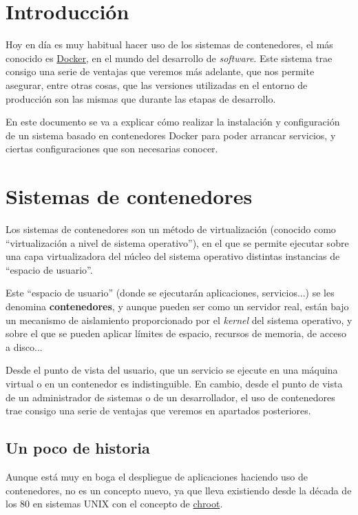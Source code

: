 \chapter{Introducción}

Hoy en día es muy habitual hacer uso de los sistemas de contenedores, el más conocido es \href{https://docs.docker.com/}{Docker}, en el mundo del desarrollo de \textit{software}. Este sistema trae consigo una serie de ventajas que veremos más adelante, que nos permite asegurar, entre otras cosas, que las versiones utilizadas en el entorno de producción son las mismas que durante las etapas de desarrollo.

En este documento se va a explicar cómo realizar la instalación y configuración de un sistema basado en contenedores Docker para poder arrancar servicios, y ciertas configuraciones que son necesarias conocer.

\chapter{Sistemas de contenedores}

Los sistemas de contenedores son un método de virtualización (conocido como “virtualización a nivel de sistema operativo”), en el que se permite ejecutar sobre una capa virtualizadora del núcleo del sistema operativo distintas instancias de “espacio de usuario”.

Este “espacio de usuario” (donde se ejecutarán aplicaciones, servicios...) se les denomina \textbf{contenedores}, y aunque pueden ser como un servidor real, están bajo un mecanismo de aislamiento proporcionado por el \textit{kernel} del sistema operativo, y sobre el que se pueden aplicar límites de espacio, recursos de memoria, de acceso a disco...


Desde el punto de vista del usuario, que un servicio se ejecute en una máquina virtual o en un contenedor es indistinguible. En cambio, desde el punto de vista de un administrador de sistemas o de un desarrollador, el uso de contenedores trae consigo una serie de ventajas que veremos en apartados posteriores.


\section{Un poco de historia}
Aunque está muy en boga el despliegue de aplicaciones haciendo uso de contenedores, no es un concepto nuevo, ya que lleva existiendo desde la década de los 80 en sistemas UNIX con el concepto de \href{https://es.wikipedia.org/wiki/Chroot}{chroot}.

